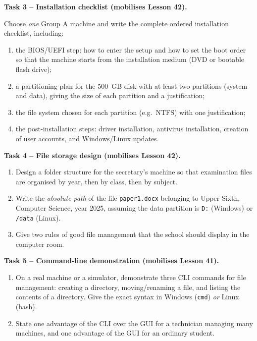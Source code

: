 \documentclass[11pt]{article}
\begin{document}
\textbf{Task 3 -- Installation checklist (mobilises Lesson 42).}\par
Choose \emph{one} Group A machine and write the complete ordered installation checklist, including:
\begin{enumerate}
\item the BIOS/UEFI step: how to enter the setup and how to set the boot order so that the machine starts from the installation medium (DVD or bootable flash drive);
\item a partitioning plan for the 500~GB disk with at least two partitions (system and data), giving the size of each partition and a justification;
\item the file system chosen for each partition (e.g.\ NTFS) with one justification;
\item the post-installation steps: driver installation, antivirus installation, creation of user accounts, and Windows/Linux updates.
\end{enumerate}

\textbf{Task 4 -- File storage design (mobilises Lesson 42).}\par
\begin{enumerate}
\item Design a folder structure for the secretary's machine so that examination files are organised by year, then by class, then by subject.
\item Write the \emph{absolute path} of the file \texttt{paper1.docx} belonging to Upper Sixth, Computer Science, year 2025, assuming the data partition is \texttt{D:} (Windows) or \texttt{/data} (Linux).
\item Give two rules of good file management that the school should display in the computer room.
\end{enumerate}

\textbf{Task 5 -- Command-line demonstration (mobilises Lesson 41).}\par
\begin{enumerate}
\item On a real machine or a simulator, demonstrate three CLI commands for file management: creating a directory, moving/renaming a file, and listing the contents of a directory. Give the exact syntax in Windows (\texttt{cmd}) \emph{or} Linux (bash).
\item State one advantage of the CLI over the GUI for a technician managing many machines, and one advantage of the GUI for an ordinary student.
\end{enumerate}
\end{document}
